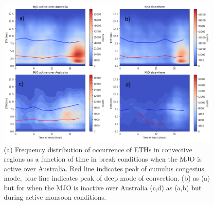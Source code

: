 \documentclass[journal abbreviation, manuscript]{copernicus}
\begin{document}
\begin{figure}[t]
\includegraphics[width=18cm]{diurnal_cycle.png}
\caption{(a) Frequency distribution of occurrence of ETHs in convective regions as a function of time in break conditions when the MJO is active over Australia. Red line indicates peak of cumulus congestus mode, blue line indicates peak of deep mode of convection. (b) as (a) but for when the MJO is inactive over Australia (c,d) as (a,b) but during active monsoon conditions.}
\label{fig:diurnal_cycle}
\end{figure}
\clearpage
\end{document}
